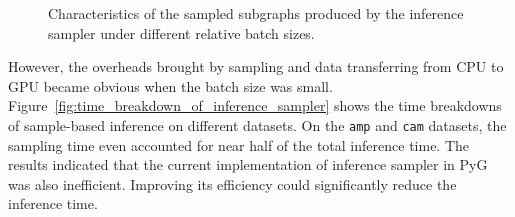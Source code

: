 \begin{figure}[H]
   \centering
   
   \caption{Characteristics of the sampled subgraphs produced by the inference sampler under different relative batch sizes.}
   \label{fig:sampled_graph_size}
\end{figure}

However, the overheads brought by sampling and data transferring from CPU to GPU became obvious when the batch size was small.
%
Figure~\ref{fig:time_breakdown_of_inference_sampler} shows the time breakdowns of sample-based inference on different datasets.
%
On the \texttt{amp} and \texttt{cam} datasets, the sampling time even accounted for near half of the total inference time.
%
The results indicated that the current implementation of inference sampler in PyG was also inefficient.
%
Improving its efficiency could significantly reduce the inference time.


